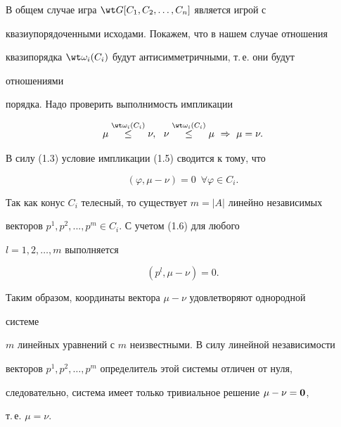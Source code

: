  


\begin{pf} 


В общем случае игра $\wt G[C_1,C_2,\dotsc,C_n]$ является игрой с 


квазиупорядоченными исходами. Покажем, что в нашем случае отношения 


квазипорядка $\wt\omega_i(C_i)$ будут антисимметричными, т.\,е. они будут 


отношениями 


порядка. Надо проверить выполнимость импликации 


\begin{equation} 


\mu\up{\wt\omega_i(C_i)}{\le}\nu, 


\ \ \nu\up{\wt\omega_i(C_i)}{\le}\mu\ \Rightarrow\ \mu=\nu. 


\end{equation} 


 


В силу (1.3) условие импликации (1.5) сводится к тому, что 


\begin{equation} 


(\varphi,\mu-\nu)=0\ \; \forall\varphi\in C_i.


\end{equation} 


Так как конус $C_i$ телесный, то существует $m=|A|$ линейно независимых 


векторов $p^1,p^2,...,p^m{\in} C_i$. С учетом (1.6) для любого 




$l=1,2,\dotsc,m$ выполняется 


$$ 


(p^l,\mu-\nu)=0. 


$$ 


Таким образом, координаты вектора $\mu-\nu$ удовлетворяют однородной 


системе 


$m$ линейных уравнений с $m$ неизвестными. В силу линейной независимости 


векторов $p^1,p^2,\dotsc,p^m$ определитель этой системы отличен от нуля, 


следовательно, система имеет только тривиальное решение $\mu-\nu=\bold 0$, 


т.\,е. $\mu=\nu$. 


\end{pf} 


